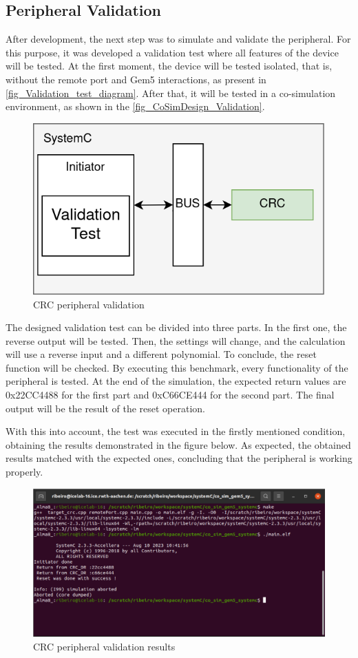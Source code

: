 \subsection{Peripheral Validation}

After development, the next step was to simulate and validate the peripheral. For this purpose, it was developed a validation test where
all features of the device will be tested. At the first moment, the device will be tested isolated, that is, without the remote port and Gem5 
interactions, as present in \autoref{fig_Validation_test_diagram}. After that, it will be tested in a co-simulation environment, as shown in the 
\autoref{fig_CoSimDesign_Validation}. 

\begin{figure}[]
	\centering
 	\includegraphics[width=0.5\linewidth]{Images/Validation_test_diagram.png} 
 	\caption{CRC peripheral validation}
	\label{fig_Validation_test_diagram}
\end{figure}

The designed validation test can be divided into three parts. In the first one, the reverse output will be tested. Then, the settings will 
change, and the calculation will use a reverse input and a different polynomial. To conclude, the reset function will be checked. 
By executing this benchmark, every functionality of the peripheral is tested. At the end of the simulation, the expected return values are 
0x22CC4488 for the first part and 0xC66CE444 for the second part. The final output will be the result of the reset operation. 

With this into account, the test was executed in the firstly mentioned condition, obtaining the results demonstrated in the figure below. As 
expected, the obtained results matched with the expected ones, concluding that the peripheral is working properly. 

\begin{figure}[H]
	\centering
 	\includegraphics[width=0.9\linewidth]{Images/Validation_SystemC.png} 
 	\caption{CRC peripheral validation results}
\end{figure}

